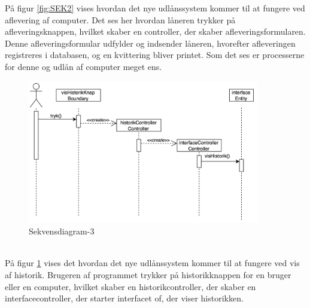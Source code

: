 \documentclass[a4paper]{article}
\begin{document}
På figur \ref{fig:SEK2} vises hvordan det nye udlånssystem kommer til at fungere ved aflevering af computer. Det ses her hvordan låneren trykker på afleveringsknappen, hvilket skaber en controller, der skaber afleveringsformularen. Denne afleveringsformular udfylder og indsender låneren, hvorefter afleveringen registreres i databasen, og en kvittering bliver printet. Som det ses er processerne for denne og udlån af computer meget ens.
\begin{figure}[h!]
\includegraphics[width=0.9\textwidth]{SekvensHistorik}
  \caption{Sekvensdiagram-3}
    \label{fig:SEK3}
  \centering
\end{figure}\\
På figur \ref{fig:SEK3} vises det hvordan det nye udlånssystem kommer til at fungere ved vis af historik. Brugeren af programmet trykker på historikknappen for en bruger eller en computer, hvilket skaber en historikcontroller, der skaber en interfacecontroller, der starter interfacet of, der viser historikken. 
\newpage
\end{document}
